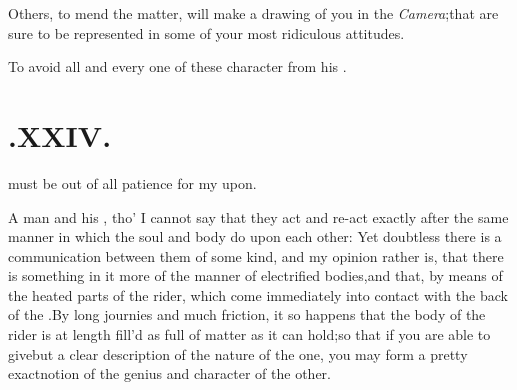 \documentclass[twoside]{article}
\begin{document}
Others, to mend the matter, will make a drawing of you in the
\textit{Camera};\tsk that\break
{}
are sure to be represented in some of your most
ridiculous attitudes.

To avoid all and every one of these
character from his .


\section{\chapstrut{}.\enspace XXIV.}

  must be out of all patience for my\break
{}
\break 
upon.

A man and his ,\break
tho’ I cannot say that they act and re-act exactly after the
same manner in which the soul and body do upon each other: Yet
doubtless there is a communication between them of some kind, and
my\break
opinion rather is, that there is something in it more of the
manner of electrified bodies,\tsk and that, by means of the
heated parts of the rider, which come immediately into contact with
the back of the .\tsk By
long journies and much friction, it so happens that the bo\-dy of
the rider is at length fill’d as full of
 matter as it can
hold;\tsk so that if you are able to give\break but a clear description of the nature
of the one, you may form a pretty exact\break notion of the genius and
character of the other.
\end{document}
